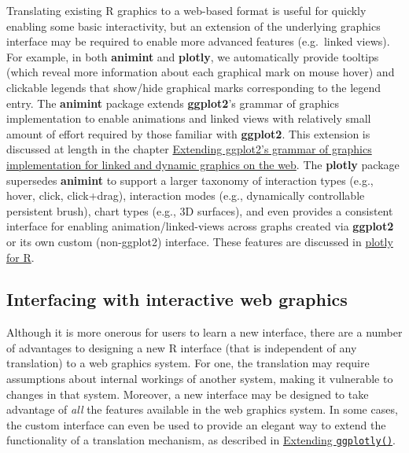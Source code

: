 \documentclass[12pt,]{isuthesis}
\begin{document}
Translating existing R graphics to a web-based format is useful for
quickly enabling some basic interactivity, but an extension of the
underlying graphics interface may be required to enable more advanced
features (e.g.~linked views). For example, in both \textbf{animint} and
\textbf{plotly}, we automatically provide tooltips (which reveal more
information about each graphical mark on mouse hover) and clickable
legends that show/hide graphical marks corresponding to the legend
entry. The \textbf{animint} package extends \textbf{ggplot2}'s grammar
of graphics implementation to enable animations and linked views with
relatively small amount of effort required by those familiar with
\textbf{ggplot2}. This extension is discussed at length in the chapter
\protect\hyperlink{animint}{Extending ggplot2's grammar of graphics
implementation for linked and dynamic graphics on the web}. The
\textbf{plotly} package supersedes \textbf{animint} to support a larger
taxonomy of interaction types (e.g., hover, click, click+drag),
interaction modes (e.g., dynamically controllable persistent brush),
chart types (e.g., 3D surfaces), and even provides a consistent
interface for enabling animation/linked-views across graphs created via
\textbf{ggplot2} or its own custom (non-ggplot2) interface. These
features are discussed in
\href{https://cpsievert.github.io/plotly_book/}{plotly for R}.

\hypertarget{interfacing-with-interactive-web-graphics}{\subsection{Interfacing
with interactive web
graphics}\label{interfacing-with-interactive-web-graphics}}

Although it is more onerous for users to learn a new interface, there
are a number of advantages to designing a new R interface (that is
independent of any translation) to a web graphics system. For one, the
translation may require assumptions about internal workings of another
system, making it vulnerable to changes in that system. Moreover, a new
interface may be designed to take advantage of \emph{all} the features
available in the web graphics system. In some cases, the custom
interface can even be used to provide an elegant way to extend the
functionality of a translation mechanism, as described in
\protect\hyperlink{extending-ggplotlyux28ux29}{Extending
\texttt{ggplotly()}}.
\end{document}
